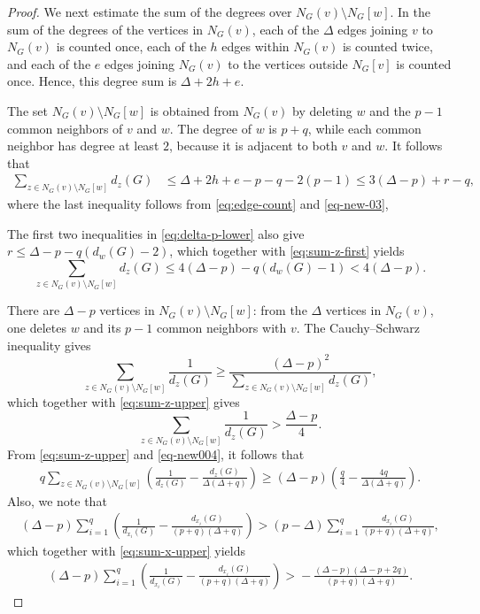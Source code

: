 \documentclass[10pt,a4paper]{amsart}
\begin{document}
\begin{proof}
We next estimate the sum of the degrees over
$N_G(v)\setminus N_G[w]$. In the sum of the degrees of the vertices in
$N_G(v)$, each of the $\Delta$ edges joining $v$ to $N_G(v)$ is counted
once, each of the $h$ edges within $N_G(v)$ is counted twice, and each
of the $e$ edges joining $N_G(v)$ to the vertices outside $N_G[v]$ is
counted once. Hence, this degree sum is $\Delta+2h+e$.

The set $N_G(v)\setminus N_G[w]$ is obtained from $N_G(v)$ by deleting
$w$ and the $p-1$ common neighbors of $v$ and $w$. The degree of $w$ is
$p+q$, while each common neighbor has degree at least $2$, because
it is adjacent to both $v$ and $w$. It follows that
\begin{align}
\sum_{z\in N_G(v)\setminus N_G[w]}d_z(G)
&\le\Delta+2h+e-p-q-2(p-1)\le3(\Delta-p)+r-q,
\label{eq:sum-z-first}
\end{align}
where the last inequality follows from \eqref{eq:edge-count} and \eqref{eq-new-03},


The first two inequalities in \eqref{eq:delta-p-lower} also give
$r\le\Delta-p-q(d_w(G)-2)$, which together with
\eqref{eq:sum-z-first} yields
\begin{equation}\label{eq:sum-z-upper}
\sum_{z\in N_G(v)\setminus N_G[w]}d_z(G)
\le4(\Delta-p)-q(d_w(G)-1)<4(\Delta-p).
\end{equation}


There are $\Delta-p$ vertices in $N_G(v)\setminus N_G[w]$: from the
$\Delta$ vertices in $N_G(v)$, one deletes $w$ and its $p-1$ common
neighbors with $v$. The Cauchy--Schwarz inequality gives
\[
\sum_{z\in N_G(v)\setminus N_G[w]}\frac1{d_z(G)}
\ge
\frac{(\Delta-p)^2}
{\displaystyle\sum_{z\in N_G(v)\setminus N_G[w]}d_z(G)},
\]
which together with \eqref{eq:sum-z-upper} gives
\begin{equation}\label{eq-new004}
\sum_{z\in N_G(v)\setminus N_G[w]}\frac1{d_z(G)}
>\frac{\Delta-p}{4}.
\end{equation}
From \eqref{eq:sum-z-upper}
and \eqref{eq-new004}, it follows that   \begin{align}
q\sum_{z\in N_G(v)\setminus N_G[w]}
\left(\frac1{d_z(G)}-\frac{d_z(G)}{\Delta(\Delta+q)}\right)
\ge(\Delta-p)
\left(\frac q4-\frac{4q}{\Delta(\Delta+q)}\right).
\label{eq:first-sum-bound}
\end{align}
Also, we note that
\begin{align*}
(\Delta-p)\sum_{i=1}^{q}
\left(\frac1{d_{x_i}(G)}-
\frac{d_{x_i}(G)}{(p+q)(\Delta+q)}\right)>(p-\Delta)\sum_{i=1}^{q}
\frac{d_{x_i}(G)}{(p+q)(\Delta+q)},
\end{align*}
which together with \eqref{eq:sum-x-upper} yields
\begin{align}
(\Delta-p)\sum_{i=1}^{q}
\left(\frac1{d_{x_i}(G)}-
\frac{d_{x_i}(G)}{(p+q)(\Delta+q)}\right)
>{}-\frac{(\Delta-p)(\Delta-p+2q)}{(p+q)(\Delta+q)}.
\label{eq:second-sum-bound}
\end{align}


\end{proof}
\end{document}
